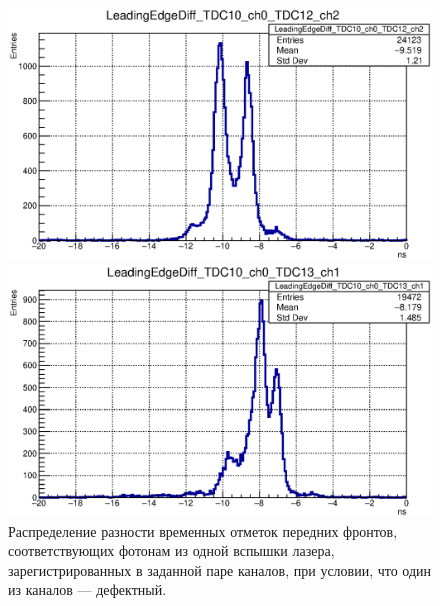 \begin{figure}
\begin{minipage}[b]{0.495\textwidth}
\includegraphics[width=1.0\textwidth]{pictures/LeadingEdgeDiff_TDC10_ch0_TDC12_ch2.eps}
\end{minipage}
\hspace{0.01\textwidth}
\begin{minipage}[b]{0.495\textwidth}
\includegraphics[width=1.0\textwidth]{pictures/LeadingEdgeDiff_TDC10_ch0_TDC13_ch1.eps}
\end{minipage}
\caption{Распределение разности временных отметок передних фронтов, соответствующих фотонам из одной вспышки лазера, зарегистрированных в заданной паре каналов, при условии, что один из каналов --- дефектный.}
\label{fig:LeadingEdgeDiffMultiplePeaks}
\end{figure}

